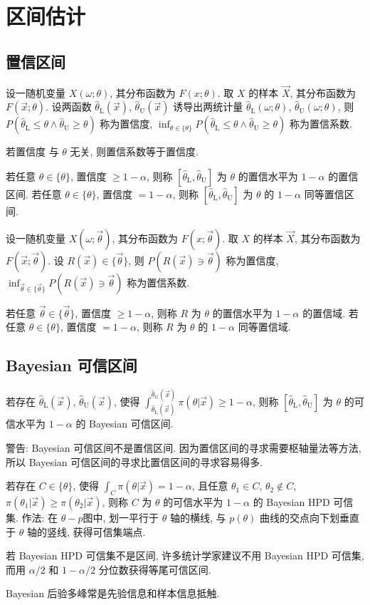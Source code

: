 \chapter{区间估计}

\section{置信区间}

设一随机变量 $X(\omega;\theta)$, 其分布函数为 $F(x;\theta)$. 取 $X$ 的样本 $\vec{X}$, 其分布函数为 $F(\vec{x};\theta)$. 设两函数 $\hat{\theta}_\text{L}(\vec{x})$, $\hat{\theta}_\text{U}(\vec{x})$ 诱导出两统计量 $\hat{\theta}_\text{L}(\omega;\theta)$, $\hat{\theta}_\text{U}(\omega;\theta)$, 则 $P(\hat{\theta}_\text{L}\le\theta\wedge\hat{\theta}_\text{U}\ge\theta)$ 称为置信度, $\inf_{\theta\in\{\theta\}}P(\hat{\theta}_\text{L}\le\theta\wedge\hat{\theta}_\text{U}\ge\theta)$ 称为置信系数.

若置信度 与 $\theta$ 无关, 则置信系数等于置信度.

若任意 $\theta\in\{\theta\}$, 置信度 $\ge1-\alpha$, 则称 $[\hat{\theta}_\text{L},\hat{\theta}_\text{U}]$ 为 $\theta$ 的置信水平为 $1-\alpha$ 的置信区间. 若任意 $\theta\in\{\theta\}$, 置信度 $=1-\alpha$, 则称 $[\hat{\theta}_\text{L},\hat{\theta}_\text{U}]$ 为 $\theta$ 的 $1-\alpha$ 同等置信区间.

设一随机变量 $X(\omega;\vec{\theta})$, 其分布函数为 $F(x;\vec{\theta})$. 取 $X$ 的样本 $\vec{X}$, 其分布函数为 $F(\vec{x};\vec{\theta})$. 设 $R(\vec{x})\in\{\vec{\theta}\}$, 则 $P(R(\vec{x})\ni \vec{\theta})$ 称为置信度, $\inf_{\vec{\theta}\in\{\vec{\theta}\}}P(R(\vec{x})\ni \vec{\theta})$ 称为置信系数.

若任意 $\vec{\theta}\in\{\vec{\theta}\}$, 置信度 $\ge1-\alpha$, 则称 $R$ 为 $\theta$ 的置信水平为 $1-\alpha$ 的置信域. 若任意 $\theta\in\{\theta\}$, 置信度 $=1-\alpha$, 则称 $R$ 为 $\theta$ 的 $1-\alpha$ 同等置信域.

\section{Bayesian 可信区间}

若存在 $\hat{\theta}_\text{L}(\vec{x})$, $\hat{\theta}_\text{U}(\vec{x})$, 使得 $\int_{\hat{\theta}_\text{L}(\vec{x})}^{\hat{\theta}_\text{U}(\vec{x})}\pi(\theta|\vec{x})\ge1-\alpha$, 则称 $[\hat{\theta}_\text{L},\hat{\theta}_\text{U}]$ 为 $\theta$ 的可信水平为 $1-\alpha$ 的 Bayesian 可信区间.

警告: Bayesian 可信区间不是置信区间. 因为置信区间的寻求需要枢轴量法等方法, 所以 Bayesian 可信区间的寻求比置信区间的寻求容易得多.

若存在 $C\in\{\theta\}$, 使得 $\int_{C}\pi(\theta|\vec{x})=1-\alpha$, 且任意 $\theta_1\in C$, $\theta_2\notin C$, $\pi(\theta_1|\vec{x})\ge\pi(\theta_2|\vec{x})$, 则称 $C$ 为 $\theta$ 的可信水平为 $1-\alpha$ 的 Bayesian HPD 可信集. 作法: 在 $\theta-p$图中, 划一平行于 $\theta$ 轴的横线, 与 $p(\theta)$ 曲线的交点向下划垂直于 $\theta$ 轴的竖线, 获得可信集端点.

若 Bayesian HPD 可信集不是区间, 许多统计学家建议不用 Bayesian HPD 可信集, 而用 $\alpha/2$ 和 $1-\alpha/2$ 分位数获得等尾可信区间.

Bayesian 后验多峰常是先验信息和样本信息抵触.
